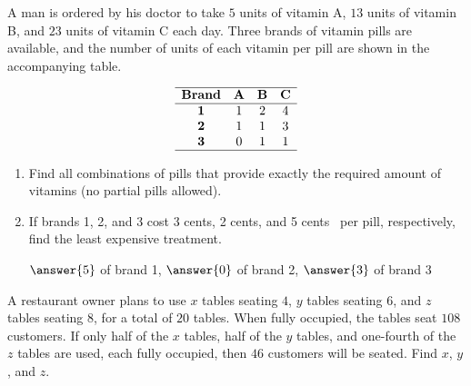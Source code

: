 \documentclass{ximera}
\begin{document}
\begin{problem}\label{prb:pills}
A man is ordered by his doctor to take $5$ units of vitamin A, $13$ units of vitamin B, and $23$ units of vitamin C each day. Three brands of vitamin pills are available, and the number of units of each vitamin per pill are shown in the accompanying table.

$$
\begin{array}{cccc}
\hline
		\textbf{Brand} &  \textbf{A} & \textbf{B} & \textbf{C} \\ \hline
		\textbf{1} & 1 & 2 & 4 \\
		\textbf{2} & 1 & 1 & 3 \\
		\textbf{3} & 0 & 1 & 1 \\ \hline
 \end{array}
$$

\begin{enumerate}
\item Find all combinations of pills that provide exactly the required amount of vitamins (no partial pills allowed).

\item If brands 1, 2, and 3 cost 3 cents, 2 cents, and 5 cents \ per pill, respectively, find the least expensive treatment.

$\answer{5}$ of brand 1, $\answer{0}$ of brand 2, $\answer{3}$ of brand 3

\end{enumerate}
\end{problem}

\begin{problem}\label{prb:tables}
A restaurant owner plans to use $x$ tables seating $4$, $y$ tables seating $6$, and $z$ tables seating $8$, for a total of $20$ tables. When fully occupied, the tables seat $108$ customers. If only half of the $x$ tables, half of the $y$ tables, and one-fourth of the $z$ tables are used, each fully occupied, then $46$ customers will be seated. Find $x$, $y$, and $z$.

\end{problem}
\end{document}
